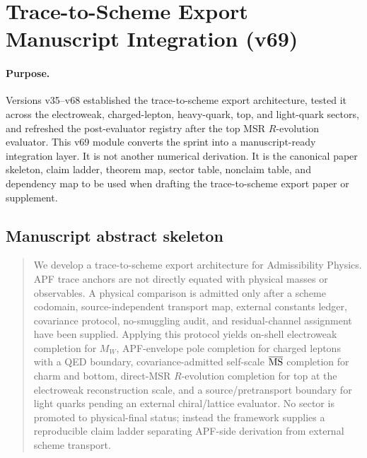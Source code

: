 
\section{Trace-to-Scheme Export Manuscript Integration (v69)}
\label{sec:v69-trace-to-scheme-manuscript-integration}

\paragraph{Purpose.}
Versions v35--v68 established the trace-to-scheme export architecture, tested it across the electroweak, charged-lepton, heavy-quark, top, and light-quark sectors, and refreshed the post-evaluator registry after the top MSR $R$-evolution evaluator.  This v69 module converts the sprint into a manuscript-ready integration layer.  It is not another numerical derivation.  It is the canonical paper skeleton, claim ladder, theorem map, sector table, nonclaim table, and dependency map to be used when drafting the trace-to-scheme export paper or supplement.

\begin{center}
\end{center}

\subsection{Manuscript abstract skeleton}
\begin{quote}
We develop a trace-to-scheme export architecture for Admissibility Physics.  APF trace anchors are not directly equated with physical masses or observables.  A physical comparison is admitted only after a scheme codomain, source-independent transport map, external constants ledger, covariance protocol, no-smuggling audit, and residual-channel assignment have been supplied.  Applying this protocol yields on-shell electroweak completion for $M_W$, APF-envelope pole completion for charged leptons with a QED boundary, covariance-admitted self-scale $\overline{\rm MS}$ completion for charm and bottom, direct-MSR $R$-evolution completion for top at the electroweak reconstruction scale, and a source/pretransport boundary for light quarks pending an external chiral/lattice evaluator.  No sector is promoted to physical-final status; instead the framework supplies a reproducible claim ladder separating APF-side derivation from external scheme transport.
\end{quote}

